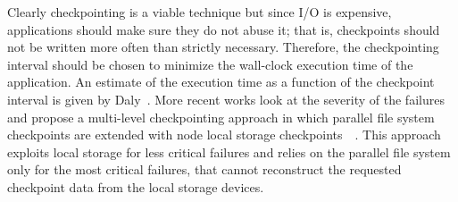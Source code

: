 Clearly checkpointing is a viable technique but since I/O is expensive, applications should make sure they do not abuse it; that is, checkpoints should not be written more often than strictly necessary. Therefore, the checkpointing 
interval should be chosen to minimize the wall-clock execution time of the application. An estimate of the execution time as a function of the checkpoint interval is given by Daly~\cite{Daly2006}. More recent works look at the severity 
of the failures and propose a multi-level checkpointing approach in which parallel file system checkpoints are extended with node local storage checkpoints~\cite{Moody2010}~\cite{Moody2010_2}. This approach exploits local storage for 
less critical failures and relies on the parallel file system only for the most critical failures, that cannot reconstruct the requested checkpoint data from the local storage devices. %





